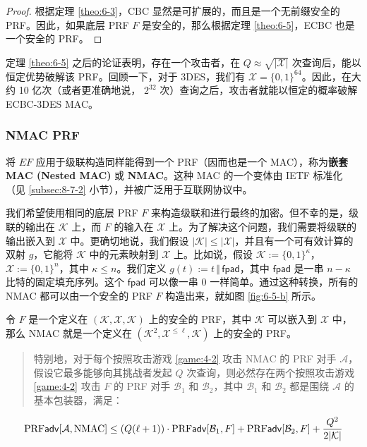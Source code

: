 \begin{proof}
根据定理 \ref{theo:6-3}，CBC 显然是可扩展的，而且是一个无前缀安全的 PRF。因此，如果底层 PRF $F$ 是安全的，那么根据定理 \ref{theo:6-5}，ECBC 也是一个安全的 PRF。
\end{proof}

定理 \ref{theo:6-5} 之后的论证表明，存在一个攻击者，在 $Q\approx\sqrt{|\mathcal{X}|}$ 次查询后，能以恒定优势破解该 PRF。回顾一下，对于 3DES，我们有 $\mathcal{X}=\{0,1\}^{64}$。因此，在大约 10 亿次（或者更准确地说， $2^{32}$ 次）查询之后，攻击者就能以恒定的概率破解 ECBC-3DES MAC。

\subsubsection{NMAC PRF}

将 $EF$ 应用于级联构造同样能得到一个 PRF（因而也是一个 MAC），称为\textbf{嵌套 MAC (Nested MAC)} 或 \textbf{NMAC}。这种 MAC 的一个变体由 IETF 标准化（见 \ref{subsec:8-7-2} 小节），并被广泛用于互联网协议中。

我们希望使用相同的底层 PRF $F$ 来构造级联和进行最终的加密。但不幸的是，级联的输出在 $\mathcal{K}$ 上，而 $F$ 的输入在 $\mathcal{X}$ 上。为了解决这个问题，我们需要将级联的输出嵌入到 $\mathcal{X}$ 中。更确切地说，我们假设 $|\mathcal{K}|\leq|\mathcal{X}|$，并且有一个可有效计算的双射 $g$，它能将 $\mathcal{K}$ 中的元素映射到 $\mathcal{X}$ 上。比如说，假设 $\mathcal{K}:=\{0,1\}^\kappa$，$\mathcal{X}:=\{0,1\}^n$，其中 $\kappa\leq n$。我们定义 $g(t):=t\,\Vert\,\mathsf{fpad}$，其中 $\mathsf{fpad}$ 是一串 $n-\kappa$ 比特的固定填充序列。这个 $\mathsf{fpad}$ 可以像一串 $0$ 一样简单。通过这种转换，所有的 NMAC 都可以由一个安全的 PRF $F$ 构造出来，就如图 \ref{fig:6-5-b} 所示。

\begin{theorem}\label{theo:6-7}
令 $F$ 是一个定义在 $(\mathcal{K},\mathcal{X},\mathcal{K})$ 上的安全的 PRF，其中 $\mathcal{K}$ 可以嵌入到 $\mathcal{X}$ 中，那么 NMAC 就是一个定义在 $(\mathcal{K}^2,\mathcal{X}^{\leq\ell},\mathcal{K})$ 上的安全的 PRF。
\begin{quote}
特别地，对于每个按照攻击游戏 \ref{game:4-2} 攻击 NMAC 的 PRF 对手 $\mathcal{A}$，假设它最多能够向其挑战者发起 $Q$ 次查询，则必然存在两个按照攻击游戏 \ref{game:4-2} 攻击 $F$ 的 PRF 对手 $\mathcal{B}_1$ 和 $\mathcal{B}_2$，其中 $\mathcal{B}_1$ 和 $\mathcal{B}_2$ 都是围绕 $\mathcal{A}$ 的基本包装器，满足：
\end{quote}
\begin{equation}\label{eq:6-20}
{\rm PRF}\mathsf{adv}[\mathcal{A},{\rm NMAC}]\leq (Q(\ell+1))\cdot{\rm PRF}\mathsf{adv}[\mathcal{B}_1,F]+{\rm PRF}\mathsf{adv}[\mathcal{B}_2,F]+\frac{Q^2}{2|\mathcal{K}|}
\end{equation}
\end{theorem}

